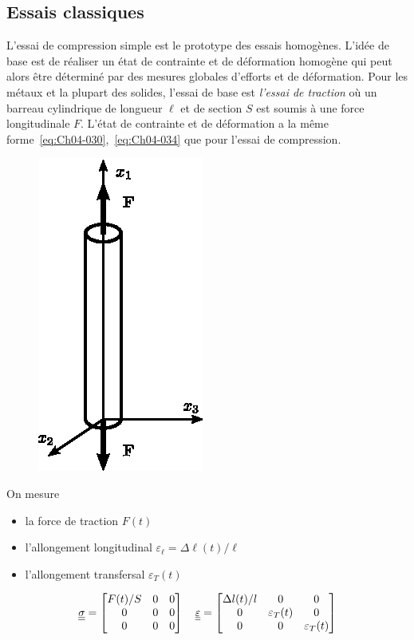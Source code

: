 \subsection{Essais classiques} \label{ssec:Ch04-1.4}
L'essai de compression simple est le prototype des essais homogènes.
L'idée de base est de réaliser un état de contrainte et de déformation homogène qui peut alors être déterminé par des mesures globales d'efforts et de déformation.
Pour les métaux et la plupart des solides, l'essai de base est \emph{l'essai de traction} où un barreau cylindrique de longueur $\ell$ et de section $S$ est soumis à une force longitudinale $F$.
L'état de contrainte et de déformation a la même forme~\eqref{eq:Ch04-030},~\eqref{eq:Ch04-034} que pour l'essai de compression.

\begin{figure}
    \begin{center}
        \vspace*{-10pt}
        \includegraphics{../images/T1_Ch04-0007}
    \end{center}
    \vspace*{10pt}
\end{figure}
On mesure 
\begin{itemize}
    \item la force de traction $F(t)$
    \item l'allongement longitudinal $\varepsilon_\ell = \Delta \ell(t)/\ell$
    \item l'allongement transfersal $\varepsilon_T(t)$
\end{itemize}
\begin{equation}
    \underline{\underline{\sigma}} =
    \begin{bmatrix}
        F(t)/S & 0 & 0 \\
        0 & 0 & 0 \\
        0 & 0 & 0
    \end{bmatrix}
    \quad
    \underline{\underline{\varepsilon}} = 
    \begin{bmatrix}
        \Delta l(t)/l & 0 & 0 \\
        0 & \varepsilon_T(t) & 0 \\
        0 & 0 & \varepsilon_T(t)
    \end{bmatrix}
    \label{eq:Ch04-035}
\end{equation}

